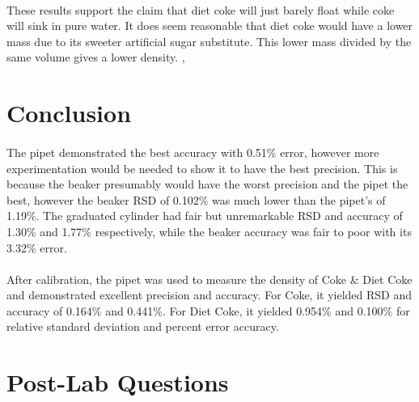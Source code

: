 \documentclass[fleqn,titlepage]{article}
\begin{document}
    \paragraph{} These results support the claim that diet coke will just barely float while coke will sink in pure water. It does seem reasonable that diet coke would have a lower mass due to its sweeter artificial sugar substitute. This lower mass divided by the same volume gives a lower density.
, 
\section*{Conclusion}
  \paragraph{} The pipet demonstrated the best accuracy with 0.51\% error, however more experimentation would be needed to show it to have the best precision. This is because the beaker presumably would have the worst precision and the pipet the best, however the beaker RSD of 0.102\% was much lower than the pipet's of 1.19\%. The graduated cylinder had fair but unremarkable RSD and accuracy of 1.30\% and 1.77\% respectively, while the beaker accuracy was fair to poor with its 3.32\% error. 

  \paragraph{} After calibration, the pipet was used to measure the density of Coke \& Diet Coke and demonstrated excellent precision and accuracy. For Coke, it yielded RSD and accuracy of 0.164\% and 0.441\%. For Diet Coke, it yielded 0.954\% and 0.100\% for relative standard deviation and percent error accuracy.

\section*{Post-Lab Questions}
\end{document}

